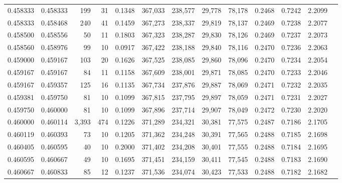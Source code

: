 \begin{tabular}{rrrrrrrrrrrrr}
0.458333 & 0.458333 &   199 &  31 &                                     0.1348 & 367,033 & 238,577 &  29,778 &  78,178 & 0.2468 & 0.7242 & 2.2099 \\
0.458333 & 0.458468 &   240 &  41 &                                     0.1459 & 367,273 & 238,337 &  29,819 &  78,137 & 0.2469 & 0.7238 & 2.2077 \\
0.458500 & 0.458556 &    50 &  11 &                                     0.1803 & 367,323 & 238,287 &  29,830 &  78,126 & 0.2469 & 0.7237 & 2.2073 \\
0.458560 & 0.458976 &    99 &  10 &                                     0.0917 & 367,422 & 238,188 &  29,840 &  78,116 & 0.2470 & 0.7236 & 2.2063 \\
0.459000 & 0.459167 &   103 &  20 &                                     0.1626 & 367,525 & 238,085 &  29,860 &  78,096 & 0.2470 & 0.7234 & 2.2054 \\
0.459167 & 0.459167 &    84 &  11 &                                     0.1158 & 367,609 & 238,001 &  29,871 &  78,085 & 0.2470 & 0.7233 & 2.2046 \\
0.459167 & 0.459357 &   125 &  16 &                                     0.1135 & 367,734 & 237,876 &  29,887 &  78,069 & 0.2471 & 0.7232 & 2.2035 \\
0.459381 & 0.459750 &    81 &  10 &                                     0.1099 & 367,815 & 237,795 &  29,897 &  78,059 & 0.2471 & 0.7231 & 2.2027 \\
0.459750 & 0.460000 &    81 &  10 &                                     0.1099 & 367,896 & 237,714 &  29,907 &  78,049 & 0.2472 & 0.7230 & 2.2020 \\
0.460000 & 0.460114 & 3,393 & 474 &                                     0.1226 & 371,289 & 234,321 &  30,381 &  77,575 & 0.2487 & 0.7186 & 2.1705 \\
0.460119 & 0.460393 &    73 &  10 &                                     0.1205 & 371,362 & 234,248 &  30,391 &  77,565 & 0.2488 & 0.7185 & 2.1698 \\
0.460405 & 0.460595 &    40 &  10 &                                     0.2000 & 371,402 & 234,208 &  30,401 &  77,555 & 0.2488 & 0.7184 & 2.1695 \\
0.460595 & 0.460667 &    49 &  10 &                                     0.1695 & 371,451 & 234,159 &  30,411 &  77,545 & 0.2488 & 0.7183 & 2.1690 \\
0.460667 & 0.460833 &    85 &  12 &                                     0.1237 & 371,536 & 234,074 &  30,423 &  77,533 & 0.2488 & 0.7182 & 2.1682 \\

\end{tabular}

